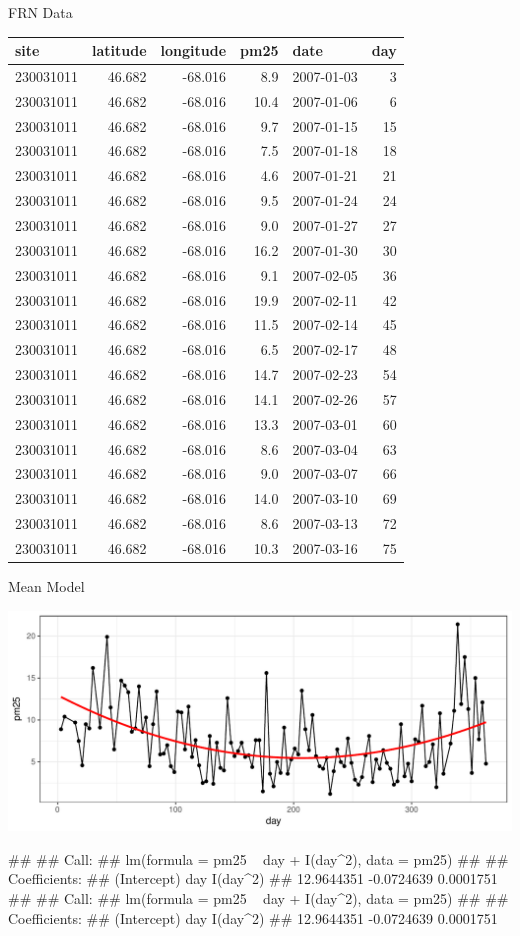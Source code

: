 \documentclass[11pt,ignorenonframetext,]{beamer}
\let\oldverbatim\verbatim
\let\endoldverbatim\endverbatim
\renewenvironment{verbatim}{\footnotesize\begin{spacing}{0.9}\oldverbatim}{\endoldverbatim\end{spacing}}
\begin{document}
\begin{frame}{FRN Data}

\footnotesize

\begin{longtable}[]{@{}lrrrlr@{}}
\toprule
site & latitude & longitude & pm25 & date & day\tabularnewline
\midrule
\endhead
230031011 & 46.682 & -68.016 & 8.9 & 2007-01-03 & 3\tabularnewline
230031011 & 46.682 & -68.016 & 10.4 & 2007-01-06 & 6\tabularnewline
230031011 & 46.682 & -68.016 & 9.7 & 2007-01-15 & 15\tabularnewline
230031011 & 46.682 & -68.016 & 7.5 & 2007-01-18 & 18\tabularnewline
230031011 & 46.682 & -68.016 & 4.6 & 2007-01-21 & 21\tabularnewline
230031011 & 46.682 & -68.016 & 9.5 & 2007-01-24 & 24\tabularnewline
230031011 & 46.682 & -68.016 & 9.0 & 2007-01-27 & 27\tabularnewline
230031011 & 46.682 & -68.016 & 16.2 & 2007-01-30 & 30\tabularnewline
230031011 & 46.682 & -68.016 & 9.1 & 2007-02-05 & 36\tabularnewline
230031011 & 46.682 & -68.016 & 19.9 & 2007-02-11 & 42\tabularnewline
230031011 & 46.682 & -68.016 & 11.5 & 2007-02-14 & 45\tabularnewline
230031011 & 46.682 & -68.016 & 6.5 & 2007-02-17 & 48\tabularnewline
230031011 & 46.682 & -68.016 & 14.7 & 2007-02-23 & 54\tabularnewline
230031011 & 46.682 & -68.016 & 14.1 & 2007-02-26 & 57\tabularnewline
230031011 & 46.682 & -68.016 & 13.3 & 2007-03-01 & 60\tabularnewline
230031011 & 46.682 & -68.016 & 8.6 & 2007-03-04 & 63\tabularnewline
230031011 & 46.682 & -68.016 & 9.0 & 2007-03-07 & 66\tabularnewline
230031011 & 46.682 & -68.016 & 14.0 & 2007-03-10 & 69\tabularnewline
230031011 & 46.682 & -68.016 & 8.6 & 2007-03-13 & 72\tabularnewline
230031011 & 46.682 & -68.016 & 10.3 & 2007-03-16 & 75\tabularnewline
\bottomrule
\end{longtable}

\end{frame}

\begin{frame}[fragile]{Mean Model}

\includegraphics{Lec13_files/figure-beamer/unnamed-chunk-12-1.pdf}

\begin{verbatim}
## 
## Call:
## lm(formula = pm25 ~ day + I(day^2), data = pm25)
## 
## Coefficients:
## (Intercept)          day     I(day^2)  
##  12.9644351   -0.0724639    0.0001751
## 
## Call:
## lm(formula = pm25 ~ day + I(day^2), data = pm25)
## 
## Coefficients:
## (Intercept)          day     I(day^2)  
##  12.9644351   -0.0724639    0.0001751
\end{verbatim}

\end{frame}
\end{document}
